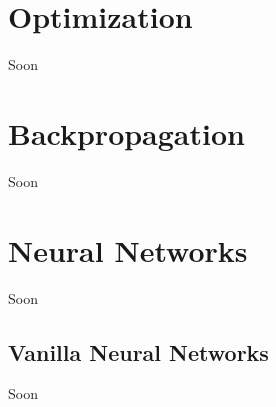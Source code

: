 \vspace{-0.3cm}




\section{Optimization}\label{sec:3.5}
\vspace{-0.5cm}
\noindent Soon

\vspace{-0.3cm}





\section{Backpropagation}\label{sec:3.6}
\vspace{-0.5cm}
\noindent Soon

\vspace{-0.3cm}




\section{Neural Networks}\label{sec:3.7}
\vspace{-0.5cm}
\noindent Soon

\vspace{-0.3cm}


\subsection{Vanilla Neural Networks}\label{sec:3.7.1}
\vspace{-0.5cm}
\noindent Soon


\vspace{-0.3cm}


